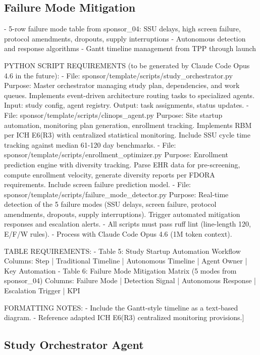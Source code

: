 \subsection{Failure Mode Mitigation}
- 5-row failure mode table from sponsor\_04: SSU delays, high screen failure,
  protocol amendments, dropouts, supply interruptions
- Autonomous detection and response algorithms
- Gantt timeline management from TPP through launch

PYTHON SCRIPT REQUIREMENTS (to be generated by Claude Code Opus 4.6 in the future):
- File: sponsor/template/scripts/study\_orchestrator.py
  Purpose: Master orchestrator managing study plan, dependencies, and work queues.
  Implements event-driven architecture routing tasks to specialized agents.
  Input: study config, agent registry. Output: task assignments, status updates.
- File: sponsor/template/scripts/clinops\_agent.py
  Purpose: Site startup automation, monitoring plan generation, enrollment tracking.
  Implements RBM per ICH E6(R3) with centralized statistical monitoring.
  Include SSU cycle time tracking against median 61-120 day benchmarks.
- File: sponsor/template/scripts/enrollment\_optimizer.py
  Purpose: Enrollment prediction engine with diversity tracking. Parse EHR data
  for pre-screening, compute enrollment velocity, generate diversity reports
  per FDORA requirements. Include screen failure prediction model.
- File: sponsor/template/scripts/failure\_mode\_detector.py
  Purpose: Real-time detection of the 5 failure modes (SSU delays, screen failure,
  protocol amendments, dropouts, supply interruptions). Trigger automated
  mitigation responses and escalation alerts.
- All scripts must pass ruff lint (line-length 120, E/F/W rules).
- Process with Claude Code Opus 4.6 (1M token context).

TABLE REQUIREMENTS:
- Table 5: Study Startup Automation Workflow
  Columns: Step | Traditional Timeline | Autonomous Timeline | Agent Owner | Key Automation
- Table 6: Failure Mode Mitigation Matrix (5 modes from sponsor\_04)
  Columns: Failure Mode | Detection Signal | Autonomous Response | Escalation Trigger | KPI

FORMATTING NOTES:
- Include the Gantt-style timeline as a text-based diagram.
- Reference adapted ICH E6(R3) centralized monitoring provisions.]

\subsection{Study Orchestrator Agent}

